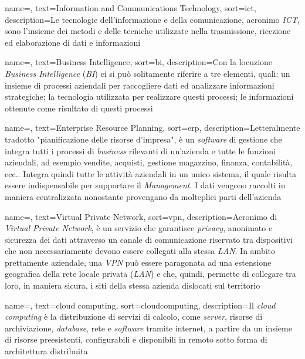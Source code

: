 {
	name=,
	text=Information and Communications Technology,
	sort=ict,
	description={Le tecnologie dell'informazione e della comunicazione, acronimo \textit{ICT}, sono l'insieme dei metodi e delle tecniche utilizzate nella trasmissione, ricezione ed elaborazione di dati e informazioni}
}

{
	name=,
	text=Business Intelligence,
	sort=bi,
	description={Con la locuzione \textit{Business Intelligence} (\textit{BI}) ci si può solitamente riferire a tre elementi, quali: un insieme di processi aziendali per raccogliere dati ed analizzare informazioni strategiche; la tecnologia utilizzata per realizzare questi processi; le informazioni ottenute come risultato di questi processi}
}

{
	name=,
	text=Enterprise Resource Planning,
	sort=erp,
	description={Letteralmente tradotto "pianificazione delle risorse d'impresa", è un \textit{software} di gestione che integra tutti i processi di \textit{business} rilevanti di un'azienda e tutte le funzioni aziendali, ad esempio vendite, acquisti, gestione magazzino, finanza, contabilità, ecc.. Integra quindi tutte le attività aziendali in un unico sistema, il quale risulta essere indispensabile per supportare il \textit{Management}. I dati vengono raccolti in maniera centralizzata nonostante provengano da molteplici parti dell'azienda}
}

{
	name=,
	text=Virtual Private Network,
	sort=vpn,
	description={Acronimo di \textit{Virtual Private Network}, è un servizio che garantisce \textit{privacy}, anonimato e sicurezza dei dati attraverso un canale di comunicazione riservato tra dispositivi che non necessariamente devono essere collegati alla stessa \textit{LAN}. In ambito prettamente aziendale, una \textit{VPN} può essere paragonata ad una estensione geografica della rete locale privata (\textit{LAN}) e che, quindi, permette di collegare tra loro, in maniera sicura, i siti della stessa azienda dislocati sul territorio}
}

{
	name=,
	text=cloud computing,
	sort=cloudcomputing,
	description={Il \textit{cloud computing} è la distribuzione di servizi di calcolo, come \textit{server}, risorse di archiviazione, \textit{database}, rete e \textit{software} tramite internet, a partire da un insieme di risorse preesistenti, configurabili e disponibili in remoto sotto forma di architettura distribuita}
}

